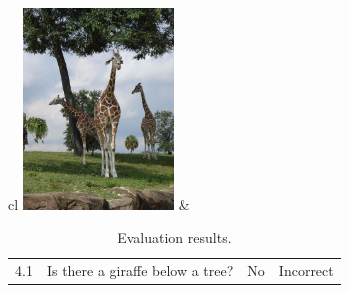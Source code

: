 \begin{table}
\begin{tabular}{cl}
	\includegraphics[width=0.3\textwidth]{vqa4.jpg} &
	\begin{tabular}{llll}
		4.1 & Is there a giraffe below a tree? & No & Incorrect
		\end{tabular} \\
		
  	\end{tabular}
\caption{Evaluation results.}
\label{tab:eval}
\end{table}
